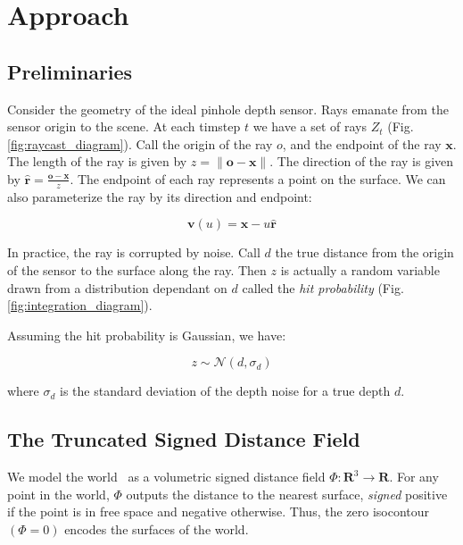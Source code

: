 \documentclass[10pt,twocolumn,letterpaper]{article}
\newcommand{\figref}[1]{Fig.\ref{#1}}
\begin{document}
\section{Approach} 
\subsection{Preliminaries}
\label{section:prelim}
Consider the geometry of the ideal pinhole depth sensor. Rays emanate from the
sensor origin to the scene. At each timstep $t$ we have a set of rays
$Z_t$ (\figref{fig:raycast_diagram}). Call the origin of the ray $o$, and the
endpoint of the ray $\mathbf{x}$. 
The length of the ray is given by $z = \|\mathbf{o}
- \mathbf{x}\|$. The direction of the ray is given by $\mathbf{\hat{r}} =
\frac{\mathbf{o} - \mathbf{x}}{z}$. The endpoint of each ray represents a point
on the surface.  We can also parameterize the ray by its direction and endpoint: 

 \begin{equation}
 	\mathbf{v}(u) = \mathbf{x} - u\mathbf{\hat{r}}
 \end{equation}

In practice, the ray is corrupted by noise. Call $d$ the true
distance from the origin of the sensor to the surface along the ray. Then $z$
is actually a random variable drawn from a distribution dependant on $d$ called
the \textit{hit probability} (\figref{fig:integration_diagram}). 

Assuming the hit probability is Gaussian, we have:

\begin{equation}
\label{eqn:hitprobability}
z \sim \mathcal{N}(d, \sigma_d)
\end{equation}

\noindent where $\sigma_d$ is the standard deviation of the depth noise for a
true depth $d$.


\subsection{The Truncated Signed Distance Field}
\label{section:TSDF}
We model the world~\cite{Curless1996} as a volumetric signed distance field $\Phi: \mathbf{R}^3
\to \mathbf{R}$. For any point in the world, $\Phi$
outputs the distance to the nearest surface, \emph{signed} positive if the point
is in free space and negative otherwise. Thus, the zero isocontour $(\Phi = 0)$
encodes the surfaces of the world.
\end{document}
